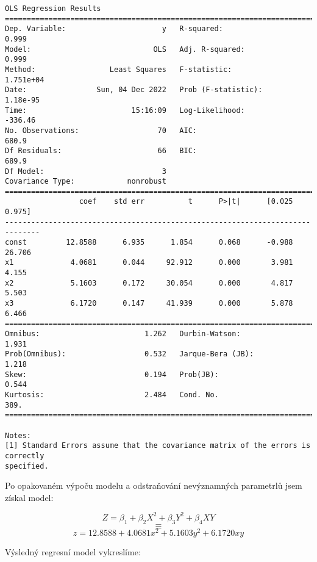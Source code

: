\documentclass[11pt]{article}
\begin{document}
    \begin{Verbatim}[commandchars=\\\{\}]
                            OLS Regression Results
==============================================================================
Dep. Variable:                      y   R-squared:                       0.999
Model:                            OLS   Adj. R-squared:                  0.999
Method:                 Least Squares   F-statistic:                 1.751e+04
Date:                Sun, 04 Dec 2022   Prob (F-statistic):           1.18e-95
Time:                        15:16:09   Log-Likelihood:                -336.46
No. Observations:                  70   AIC:                             680.9
Df Residuals:                      66   BIC:                             689.9
Df Model:                           3
Covariance Type:            nonrobust
==============================================================================
                 coef    std err          t      P>|t|      [0.025      0.975]
------------------------------------------------------------------------------
const         12.8588      6.935      1.854      0.068      -0.988      26.706
x1             4.0681      0.044     92.912      0.000       3.981       4.155
x2             5.1603      0.172     30.054      0.000       4.817       5.503
x3             6.1720      0.147     41.939      0.000       5.878       6.466
==============================================================================
Omnibus:                        1.262   Durbin-Watson:                   1.931
Prob(Omnibus):                  0.532   Jarque-Bera (JB):                1.218
Skew:                           0.194   Prob(JB):                        0.544
Kurtosis:                       2.484   Cond. No.                         389.
==============================================================================

Notes:
[1] Standard Errors assume that the covariance matrix of the errors is correctly
specified.
    \end{Verbatim}

    Po opakovaném výpoču modelu a odstraňování nevýznamných parametrlů jsem
získal model:

\[ Z = \beta_1 + \beta_2X^2 + \beta_3Y^2 + \beta_4XY \] \[ \equiv \]
\[ z = 12.8588 + 4.0681x^2 + 5.1603y^2 + 6.1720xy \]

Výsledný regresní model vykreslíme:
\end{document}
